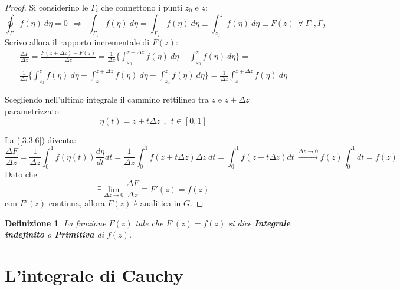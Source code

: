 \documentclass[twoside]{article}
\newtheorem{definition}{Definizione}[section]
\begin{document}
\begin{proof}
Si considerino le $\Gamma_i$ che connettono i punti $z_0$ e $z$:
\begin{equation}
    \oint_{\Gamma}f(\eta) \ d\eta=0 \ \ \Rightarrow \ \  \int_{\Gamma_1}f(\eta) \ d\eta=\int_{\Gamma_2}f(\eta) \ d\eta\equiv\int_{z_0}^{z}f(\eta) \ d\eta\equiv F(z) \ \ \forall \ \Gamma_1,\Gamma_2
\end{equation}
Scrivo allora il rapporto incrementale di $F(z)$:
\begin{equation} \label{3.3.6} \begin{split}
    \frac{\Delta F}{\Delta z}=\frac{F(z+\Delta z) - F(z)}{\Delta z}=\frac{1}{\Delta z} \biggl \{ \int_{z_0}^{z+\Delta z} f(\eta) \ d\eta - \int_{z_0}^{z} f(\eta) \ d\eta \biggr\}= \\ \frac{1}{\Delta z} \biggl \{ \int_{z_0}^{z} f(\eta) \ d\eta + \int_{z}^{z+\Delta z} f(\eta) \ d\eta  - \int_{z_0}^{z} f(\eta) \ d\eta \biggr\}=  \frac{1}{\Delta z} \int_{z}^{z+\Delta z} f(\eta) \ d\eta
\end{split}\end{equation}

Scegliendo nell'ultimo integrale il cammino rettilineo tra $z$ e $z+\Delta z$ parametrizzato:
\begin{equation}
    \eta(t)=z+t\Delta z \ \ , \ \ t \in [0,1]
\end{equation}

La (\ref{3.3.6}) diventa:
\begin{equation}
    \frac{\Delta F}{\Delta z}=\frac{1}{\Delta z}\int_0 ^1 f(\eta(t))\frac{d\eta}{dt}dt=\frac{1}{\Delta z}\int_0 ^1 f(z+t\Delta z) \Delta z \ dt = \int_0 ^1 f(z+t\Delta z) dt \ \xrightarrow{\Delta z \to 0}f(z) \int_0 ^1 dt=f(z)
\end{equation}
Dato che
\begin{equation}
    \exists \lim_{\Delta z \to 0} \frac{\Delta F}{\Delta z}\equiv F'(z)=f(z)
\end{equation}
con $F'(z)$ continua, allora $F(z)$ è analitica in $G$.

\end{proof}

\begin{definition} La funzione $F(z)$ tale che $F'(z)=f(z)$ si dice \textbf{Integrale indefinito} o \textbf{Primitiva} di $f(z)$.
\end{definition}


\newpage
\section{L'integrale di Cauchy}
\end{document}
